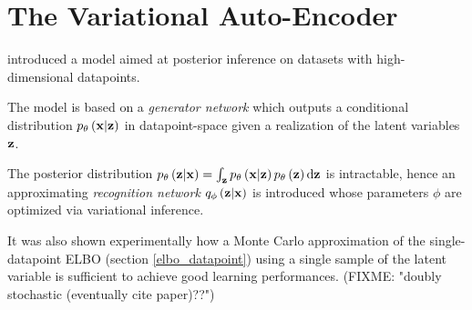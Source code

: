 \section{The Variational Auto-Encoder}

\cite{1312.6114} introduced a model aimed at posterior inference 
on datasets with high-dimensional datapoints.

The model is based on a \emph{generator network} which outputs a conditional
distribution $p_\theta\left(\mathbf{x}|\mathbf{z}\right)$ 
in datapoint-space given a realization of the latent variables $\mathbf{z}$.

The posterior distribution $p_\theta\left(\mathbf{z}|\mathbf{x}\right)=\int_{\mathbf{z}} p_\theta\left(\mathbf{x}|\mathbf{z}\right) p_\theta\left(\mathbf{z}\right) \mathrm{d}\mathbf{z}$ is intractable,
hence an approximating \emph{recognition network}
$q_\phi\left(\mathbf{z}|\mathbf{x}\right)$ is introduced whose parameters $\phi$ are
optimized via variational inference.

It was also shown experimentally how a Monte Carlo approximation of
the single-datapoint ELBO (section \ref{elbo_datapoint})
using a single sample of the latent variable is sufficient to
achieve good learning performances. (FIXME: "doubly stochastic (eventually cite paper)??")


